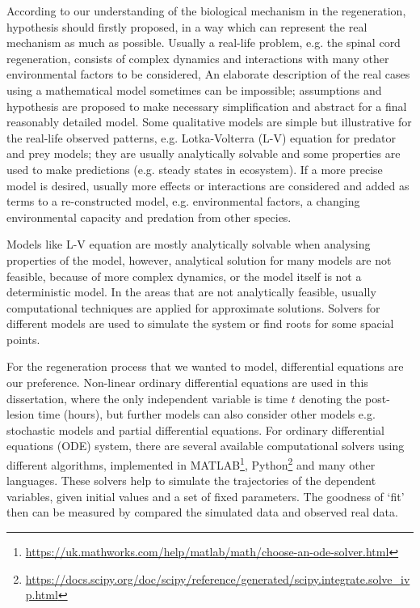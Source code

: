 \documentclass[12pt,a4paper]{report}
\begin{document}
According to our understanding of the biological mechanism in the regeneration, hypothesis should firstly proposed, in a way which can represent the real  mechanism as much as possible. Usually a real-life problem, e.g. the spinal cord regeneration, consists of complex dynamics and interactions with many other environmental factors to be considered, An elaborate description of the real cases using a mathematical model sometimes can be impossible; assumptions and hypothesis are proposed to make necessary simplification and abstract for a final reasonably detailed model. Some qualitative models are simple but illustrative for the real-life observed patterns, e.g. Lotka-Volterra (L-V) equation for predator and prey models; they are usually analytically solvable and some properties are used to make predictions (e.g. steady states in ecosystem). If a more precise model is desired, usually more effects or interactions are considered and added as terms to a re-constructed model, e.g. environmental factors, a changing environmental capacity and predation from other species.

Models like L-V equation are mostly analytically solvable when analysing properties of the model, however, analytical solution for many models are not feasible, because of more complex dynamics, or the model itself is not a deterministic model. In the areas that are not analytically feasible, usually computational techniques are applied for approximate solutions. Solvers for different models are used to simulate the system or find roots for some spacial points.

For the regeneration process that we wanted to model, differential equations are our preference. Non-linear ordinary differential equations are used in this dissertation, where the only independent variable is time $t$ denoting the post-lesion time (hours), but further models can also consider other models e.g. stochastic models and partial differential equations. For ordinary differential equations (ODE) system, there are several available computational solvers using different algorithms, implemented in MATLAB\footnote[1] {\url{https://uk.mathworks.com/help/matlab/math/choose-an-ode-solver.html}}, Python\footnote[2]{\url{https://docs.scipy.org/doc/scipy/reference/generated/scipy.integrate.solve_ivp.html}} and many other languages. These solvers help to simulate the trajectories of the dependent variables, given initial values and a set of fixed parameters. The goodness of `fit' then can be measured by compared the simulated data and observed real data.
\end{document}
